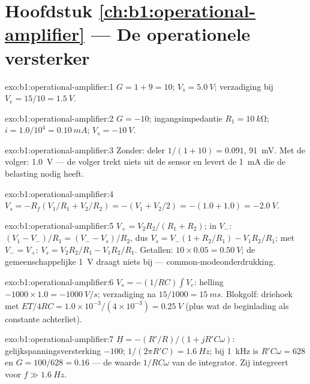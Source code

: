 \section*{Hoofdstuk \ref{ch:b1:operational-amplifier} --- De operationele versterker}

\begin{solution}{exo:b1:operational-amplifier:1}
$G = 1 + 9 = 10$; $V_s = \qty{5.0}{V}$; verzadiging bij $V_e = 15/10 =
\qty{1.5}{V}$.
\end{solution}

\begin{solution}{exo:b1:operational-amplifier:2}
$G = -10$; ingangsimpedantie $R_1 = \qty{10}{k\ohm}$; $i = 1.0/10^4 =
\qty{0.10}{mA}$; $V_s = \qty{-10}{V}$.
\end{solution}

\begin{solution}{exo:b1:operational-amplifier:3}
Zonder: deler $1/(1 + 10) = 0.091$, \qty{91}{mV}. Met de volger:
\qty{1.0}{V} --- de volger trekt niets uit de sensor en levert
de \qty{1}{mA} die de belasting nodig heeft.
\end{solution}

\begin{solution}{exo:b1:operational-amplifier:4}
$V_s = -R_f(V_1/R_1 + V_2/R_2) = -(V_1 + V_2/2) = -(1.0 + 1.0) = \qty{-2.0}{V}$.
\end{solution}

\begin{solution}{exo:b1:operational-amplifier:5}
$V_+ = V_2R_2/(R_1 + R_2)$; in $V_-$: $(V_1 - V_-)/R_1 = (V_- - V_s)/R_2$,
dus $V_s = V_-(1 + R_2/R_1) - V_1R_2/R_1$; met $V_- = V_+$:
$V_s = V_2R_2/R_1 - V_1R_2/R_1$. Getallen: $10 \times 0.05 = \qty{0.50}{V}$;
de gemeenschappelijke \qty{1}{V} draagt niets bij --- common-modeonderdrukking.
\end{solution}

\begin{solution}{exo:b1:operational-amplifier:6}
$V_s = -(1/RC)\int V_e$: helling $-1000 \times 1.0 = \qty{-1000}{V/s}$;
verzadiging na $15/1000 = \qty{15}{ms}$. Blokgolf: driehoek met
 $ET/4RC = 1.0 \times 10^{-3}/(4 \times 10^{-3}) = \qty{0.25}{V}$
(plus wat de beginlading als constante achterliet).
\end{solution}

\begin{solution}{exo:b1:operational-amplifier:7}
$\underline H = -(R'/R)/(1 + jR'C\omega)$: gelijkspanningsversterking $-100$; 
$1/(2\pi R'C) = \qty{1.6}{Hz}$; bij \qty{1}{kHz} is $R'C\omega = 628$ en $G =
100/628 = 0.16$ --- de waarde $1/RC\omega$ van de integrator. Zij integreert voor
$f \gg \qty{1.6}{Hz}$.
\end{solution}

